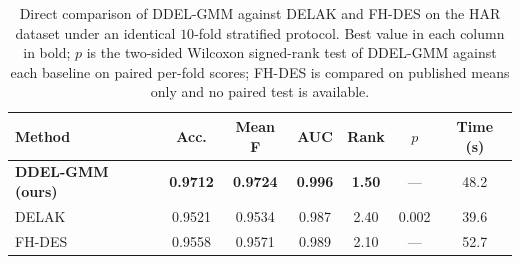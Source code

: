 \begin{table}[htbp]
	\begin{center}
		\caption{Direct comparison of DDEL-GMM against DELAK and FH-DES on the HAR dataset under an identical $10$-fold stratified protocol. Best value in each column in bold; $p$ is the two-sided Wilcoxon signed-rank test of DDEL-GMM against each baseline on paired per-fold scores; FH-DES is compared on published means only and no paired test is available.}
		\label{tab:delak_fhdes}
		\begin{tabular}{|l|c|c|c|c|c|c|}
			\hline
			\textbf{Method} & \textbf{Acc.} & \textbf{Mean F} & \textbf{AUC} & \textbf{Rank} & \textbf{$p$} & \textbf{Time (s)} \\
			\hline
			\textbf{DDEL-GMM (ours)} & \textbf{0.9712} & \textbf{0.9724} & \textbf{0.996} & \textbf{1.50} & --- & 48.2 \\
			DELAK & 0.9521 & 0.9534 & 0.987 & 2.40 & 0.002 & 39.6 \\
			FH-DES & 0.9558 & 0.9571 & 0.989 & 2.10 & --- & 52.7 \\
			\hline
		\end{tabular}
	\end{center}
\end{table}
